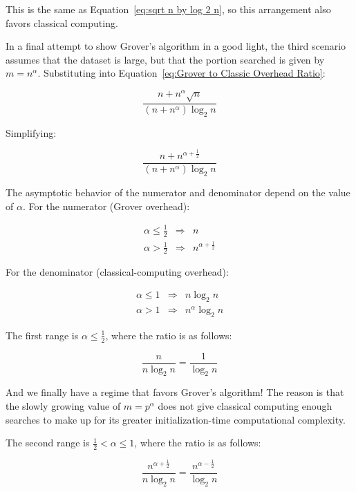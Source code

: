 This is the same as Equation~\ref{eq:sqrt n by log 2 n},
so this arrangement also favors classical computing.

In a final attempt to show Grover's algorithm in a good light,
the third scenario assumes that the dataset is large, but that the portion
searched is given by $m = n^\alpha$.
Substituting into
Equation~\ref{eq:Grover to Classic Overhead Ratio}:

\begin{equation}
	\frac{n + n^\alpha \sqrt n}{\left( n + n^\alpha \right) \log_2 n}
\end{equation}

Simplifying:

\begin{equation}
	\frac{n + n^{\alpha + \frac{1}{2}}}{\left( n + n^\alpha \right) \log_2 n}
\end{equation}

The asymptotic behavior of the numerator and denominator depend on
the value of $\alpha$.
For the numerator (Grover overhead):

\begin{eqnarray}
	\alpha \leq \frac{1}{2} & \Rightarrow & n \\
	\alpha > \frac{1}{2} & \Rightarrow & n^{\alpha + \frac{1}{2}}
\end{eqnarray}

For the denominator (classical-computing overhead):

\begin{eqnarray}
	\alpha \leq 1 & \Rightarrow & n \log_2 n \\
	\alpha > 1 & \Rightarrow & n^\alpha \log_2 n
\end{eqnarray}

The first range is $\alpha \leq \frac{1}{2}$, where the ratio is as follows:

\begin{equation}
	\frac{n}{n \log_2 n} = \frac{1}{\log_2 n}
\end{equation}

And we finally have a regime that favors Grover's algorithm!
The reason is that the slowly growing value of $m = p^\alpha$ does
not give classical computing enough searches to make up for its
greater initialization-time computational complexity.

The second range is $\frac{1}{2} < \alpha \leq 1$,
where the ratio is as follows:

\begin{equation}
	\frac{n^{\alpha + \frac{1}{2}}}{n \log_2 n} =
	\frac{n^{\alpha - \frac{1}{2}}}{\log_2 n}
\end{equation}

